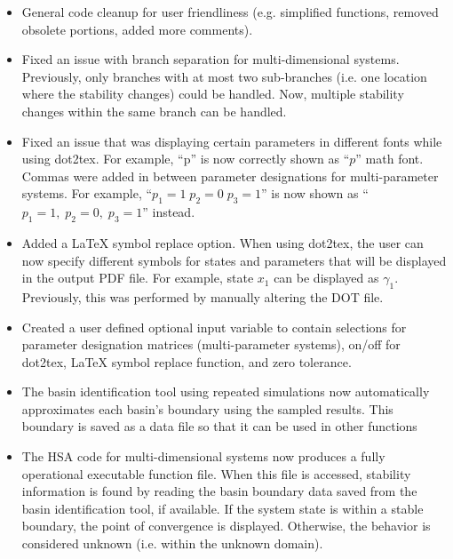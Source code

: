 \documentclass[12pt]{article}
\begin{document}
\begin{itemize}
\item General code cleanup for user friendliness (e.g. simplified functions, removed obsolete portions, added more comments).

\item Fixed an issue with branch separation for multi-dimensional systems. Previously, only branches with at most two sub-branches (i.e. one location where the stability changes) could be handled. Now, multiple stability changes within the same branch can be handled.

\item Fixed an issue that was displaying certain parameters in different fonts while using dot2tex. For example, ``p'' is now correctly shown as ``$p$'' math font. Commas were added in between parameter designations for multi-parameter systems. For example, ``$p_1=1 \; p_2=0 \; p_3=1$'' is now shown as ``$p_1=1, \; p_2=0, \; p_3=1$'' instead.

\item Added a LaTeX symbol replace option. When using dot2tex, the user can now specify different symbols for states and parameters that will be displayed in the output PDF file. For example, state $x_1$ can be displayed as $\gamma_1$. Previously, this was performed by manually altering the DOT file.

\item Created a user defined optional input variable to contain selections for parameter designation matrices (multi-parameter systems), on/off for dot2tex, LaTeX symbol replace function, and zero tolerance.

\item The basin identification tool using repeated simulations now automatically approximates each basin's boundary using the sampled results. This boundary is saved as a data file so that it can be used in other functions

\item The HSA code for multi-dimensional systems now produces a fully operational executable function file. When this file is accessed, stability information is found by reading the basin boundary data saved from the basin identification tool, if available. If the system state is within a stable boundary, the point of convergence is displayed. Otherwise, the behavior is considered unknown (i.e. within the unknown domain).

\end{itemize}
\end{document}
